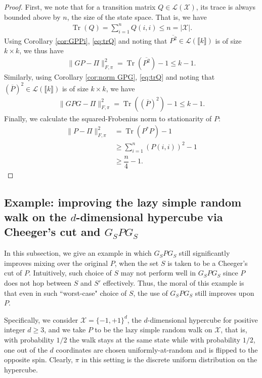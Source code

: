 \documentclass[EJP]{ejpecp} %
\DeclareMathOperator{\Tr}{Tr}
\begin{document}
\begin{proof}
    First, we note that for a transition matrix $Q \in \mathcal{L}(\mathcal{X})$, its trace is always bounded above by $n$, the size of the state space. That is, we have
    \begin{align}\label{eq:trQ}
        \Tr(Q) = \sum_{i=1}^n Q(i,i) \leq n = |\mathcal{X}|.
    \end{align}
    Using Corollary \ref{cor:GPPi}, \eqref{eq:trQ} and noting that $\overline{P^2} \in \mathcal{L}(\llbracket k \rrbracket)$ is of size $k \times k$, we thus have
    \begin{align*}
        \|GP- \Pi\|^2_{F,\pi} = \Tr(\overline{P^2}) - 1 \leq k - 1.
    \end{align*}
    Similarly, using Corollary \ref{cor:norm GPG}, \eqref{eq:trQ} and noting that $(\overline{P})^2 \in \mathcal{L}(\llbracket k \rrbracket)$ is of size $k \times k$, we have
    \begin{align*}
        \|GPG- \Pi\|^2_{F,\pi} = \Tr((\overline{P})^2) - 1 \leq k - 1.
    \end{align*}
    Finally, we calculate the squared-Frobenius norm to stationarity of $P$:
    \begin{align*}
        \|P - \Pi\|_{F,\pi}^2 &= \Tr(P^*P) - 1 \\
                              &\geq \sum_{i=1}^n (P(i,i))^2 - 1 \\
                              &\geq \dfrac{n}{4} - 1.
    \end{align*}
\end{proof}

\subsection{Example: improving the lazy simple random walk on the $d$-dimensional hypercube via Cheeger's cut and $G_S P G_S$}

In this subsection, we give an example in which $G_S P G_S$ still significantly improves mixing over the original $P$, when the set $S$ is taken to be a Cheeger's cut of $P$. Intuitively, such choice of $S$ may not perform well in $G_S P G_S$ since $P$ does not hop between $S$ and $S'$ effectively. Thus, the moral of this example is that even in such ``worst-case" choice of $S$, the use of $G_S P G_S$ still improves upon $P$.

Specifically, we consider $\mathcal{X} = \{-1,+1\}^d$, the $d$-dimensional hypercube for positive integer $d \geq 3$, and we take $P$ to be the lazy simple random walk on $\mathcal{X}$, that is, with probability $1/2$ the walk stays at the same state while with probability $1/2$, one out of the $d$ coordinates are chosen uniformly-at-random and is flipped to the opposite spin. Clearly, $\pi$ in this setting is the discrete uniform distribution on the hypercube.
\end{document}
